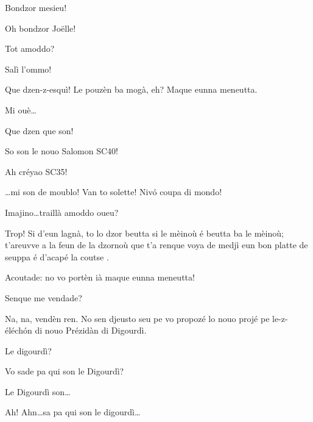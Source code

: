 \begin{drama}
\Joellespeaks Bondzor mesieu!


\Jeanspeaks Oh bondzor Jo\"{e}lle!

\Joellespeaks Tot amoddo?

\Dallasspeaks {} Salì l'ommo!


\Dallasspeaks Que dzen-z-esquì! Le pouzèn ba mogà, eh? Ma\-que eunna meneutta.

\Jeanspeaks Mi ouè\ldots


\Joellespeaks Que dzen que son!

\Jeanspeaks {} So son le nouo Salomon SC40!

\Dallasspeaks {} Ah créyao SC35!

\Jeanspeaks {} \ldots mi son de moublo! Van to solette! Niv\'o coupa di mondo! 

\Dallasspeaks Imajino\ldots traillà amoddo oueu?

\Jeanspeaks {} Trop! Si d'eun lagnà, to lo dzor beutta si le mèinoù é beutta ba le mèinoù; t'areuvve a la feun de la dzornoù que t'a renque voya de medjì eun bon platte de seuppa é d'acapé la coutse  . 

\Dallasspeaks Acoutade: no vo portèn ià maque eunna meneutta!

\Jeanspeaks Senque me vendade?

\Joellespeaks Na, na, vendèn ren. No sen djeusto seu pe vo propozé lo nouo projé pe le-z-éléch\'on di nouo Prézidàn di Digourdì.

\Jeanspeaks Le digourdì?

\Dallasspeaks Vo sade pa qui son le Digourdì?


\Joellespeaks Le Digourdì son\ldots


\Dallasspeaks Ah! Ahn\ldots sa pa qui son le digourdì\ldots


\end{drama}
